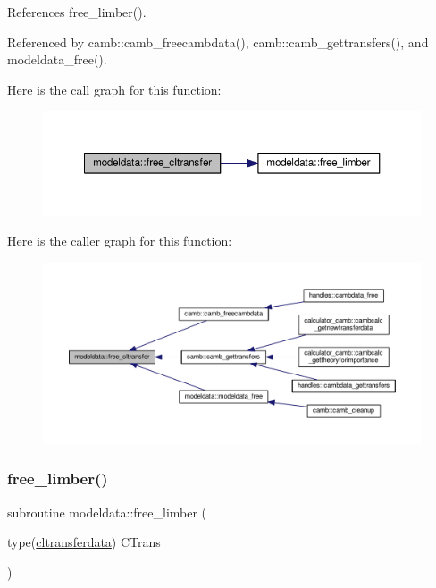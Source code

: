 References free\+\_\+limber().



Referenced by camb\+::camb\+\_\+freecambdata(), camb\+::camb\+\_\+gettransfers(), and modeldata\+\_\+free().

Here is the call graph for this function\+:
\nopagebreak
\begin{figure}[H]
\begin{center}
\leavevmode
\includegraphics[width=350pt]{namespacemodeldata_a2d6ecb98a3edf71d3e3ed3ee1ffb82d1_cgraph}
\end{center}
\end{figure}
Here is the caller graph for this function\+:
\nopagebreak
\begin{figure}[H]
\begin{center}
\leavevmode
\includegraphics[width=350pt]{namespacemodeldata_a2d6ecb98a3edf71d3e3ed3ee1ffb82d1_icgraph}
\end{center}
\end{figure}
\mbox{\label{namespacemodeldata_a89ab0d30547c35685982ecf01d7145bd}} 
\subsubsection{\texorpdfstring{free\+\_\+limber()}{free\_limber()}}
{\footnotesize\ttfamily subroutine modeldata\+::free\+\_\+limber (\begin{DoxyParamCaption}\item[{type(\mbox{\hyperlink{structmodeldata_1_1cltransferdata}{cltransferdata}})}]{C\+Trans }\end{DoxyParamCaption})}



